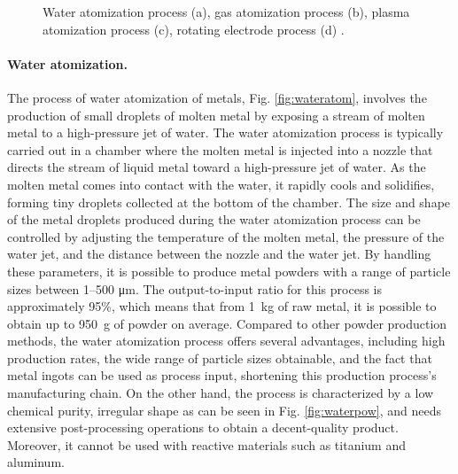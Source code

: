 \begin{figure}
{    }
    \qquad
    \caption[Atomization processes.]{Water atomization process (a), gas atomization process (b), plasma atomization process (c), rotating electrode process (d) \cite{material_technology_innovations_co_rotating_2020, material_technology_innovations_co_water_2020, material_technology_innovations_co_gas_2020, inovar_communications_ltd_metal_2020}.}
    \label{fig:atom}
\end{figure}
\paragraph{Water atomization.}The process of water atomization of metals, Fig. \ref{fig:wateratom}, involves the production of small droplets of molten metal by exposing a stream of molten metal to a high-pressure jet of water. The water atomization process is typically carried out in a chamber where the molten metal is injected into a nozzle that directs the stream of liquid metal toward a high-pressure jet of water. As the molten metal comes into contact with the water, it rapidly cools and solidifies, forming tiny droplets collected at the bottom of the chamber. The size and shape of the metal droplets produced during the water atomization process can be controlled by adjusting the temperature of the molten metal, the pressure of the water jet, and the distance between the nozzle and the water jet. By handling these parameters, it is possible to produce metal powders with a range of particle sizes between \numrange[range-phrase = --]{1}{500} \unit{\micro\metre}. The output-to-input ratio for this process is approximately 95\%, which means that from \SI{1}{\kilo\gram} of raw metal, it is possible to obtain up to \SI{950}{\gram} of powder on average. Compared to other powder production methods, the water atomization process offers several advantages, including high production rates, the wide range of particle sizes obtainable, and the fact that metal ingots can be used as process input, shortening this production process's manufacturing chain. On the other hand, the process is characterized by a low chemical purity, irregular shape as can be seen in Fig. \ref{fig:waterpow}, and needs extensive post-processing operations to obtain a decent-quality product. Moreover, it cannot be used with reactive materials such as titanium and aluminum.
